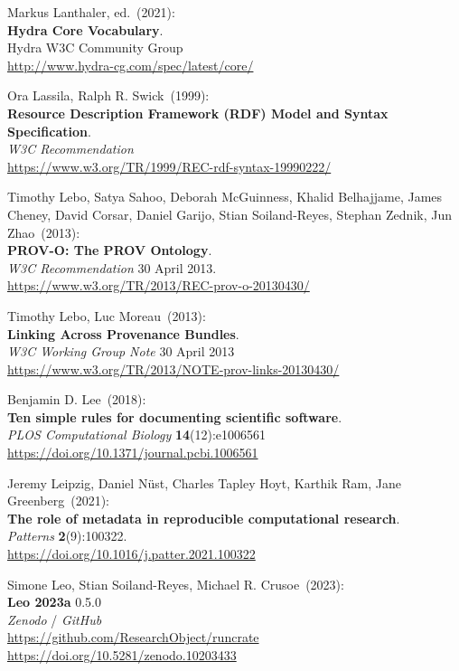\begin{thebibliography}{9}
Markus Lanthaler, ed.~(2021): \\
\textbf{Hydra Core Vocabulary}.\\
Hydra W3C Community Group\\
\url{http://www.hydra-cg.com/spec/latest/core/} 

Ora Lassila, Ralph R. Swick~(1999): \\
\textbf{Resource {Description Framework} ({RDF}) {Model} and {Syntax Specification}}. \\
\emph{W3C Recommendation}\\
\url{https://www.w3.org/TR/1999/REC-rdf-syntax-19990222/}  

Timothy Lebo, Satya Sahoo, Deborah McGuinness, Khalid Belhajjame, James Cheney, David Corsar, Daniel Garijo, Stian Soiland-Reyes,  Stephan Zednik, Jun Zhao~(2013): \\
\textbf{PROV-O: The PROV Ontology}.\\
\emph{W3C Recommendation} 30 April 2013.\\
\url{https://www.w3.org/TR/2013/REC-prov-o-20130430/}

Timothy Lebo, Luc Moreau~(2013): \\
\textbf{Linking {Across Provenance Bundles}}.\\
\emph{W3C Working Group Note} 30 April 2013 \\
\url{https://www.w3.org/TR/2013/NOTE-prov-links-20130430/}

Benjamin D. Lee~(2018):\\
\textbf{Ten simple rules for documenting scientific software}.\\
\emph{PLOS Computational Biology} \textbf{14}(12):e1006561\\
\url{https://doi.org/10.1371/journal.pcbi.1006561}

Jeremy Leipzig, Daniel Nüst, Charles Tapley Hoyt, Karthik Ram, Jane Greenberg~(2021): \\
\textbf{The role of metadata in reproducible computational research}.\\
\emph{Patterns} \textbf{2}(9):100322.\\
\url{https://doi.org/10.1016/j.patter.2021.100322}

Simone Leo, Stian Soiland-Reyes, Michael R. Crusoe~(2023): \\
\textbf{Leo 2023a} 0.5.0\\
\emph{Zenodo} / \emph{GitHub}\\
\url{https://github.com/ResearchObject/runcrate}\\
\url{https://doi.org/10.5281/zenodo.10203433}


\end{thebibliography}
